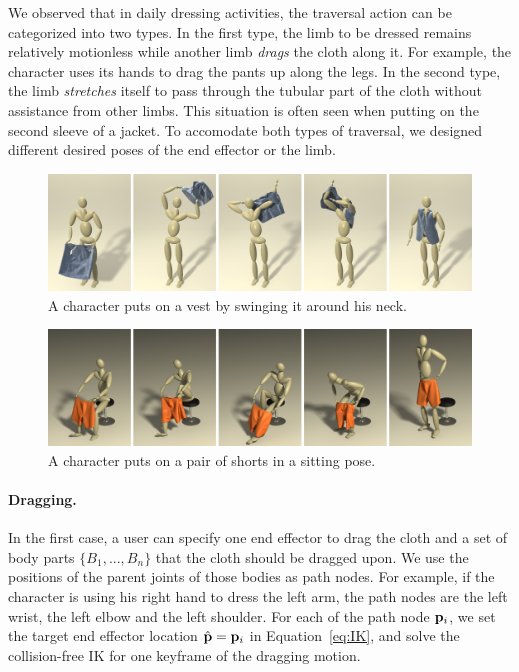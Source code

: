 We observed that in daily dressing activities, the traversal action can be categorized into two types. In the first type, the limb to be dressed remains relatively motionless while another limb \emph{drags} the cloth along it. For example, the character uses its hands to drag the pants up along the legs. In the second type, the limb \emph{stretches} itself to pass through the tubular part of the cloth without assistance from other limbs. This situation is often seen when putting on the second sleeve of a jacket. To accomodate both types of traversal, we designed different desired poses of the end effector or the limb.


\begin{figure}[!t]
  \centering
  \includegraphics[width=\textwidth]{images/vest}
  \caption{A character puts on a vest by swinging it around his neck.}
  \label{fig:vest}
\end{figure}

\begin{figure}[!t]
  \centering
  \includegraphics[width=\textwidth]{images/shortsSitting}
  \caption{A character puts on a pair of shorts in a sitting pose.}
  \label{fig:shorts1}
\end{figure}



\paragraph{Dragging.} In the first case, a user can specify one end effector to drag the cloth and a set of body parts $\{B_1 ,..., B_n\}$ that the cloth should be dragged upon. We use the positions of the parent joints of those bodies as path nodes. For example, if the character is using his  right hand to dress the left arm, the path nodes are the left wrist, the left elbow and the left shoulder. For each of the path node $\mathbf{p}_i$, we set the target end effector location $\hat{\mathbf{p}}=\mathbf{p}_i$ in Equation~\ref{eq:IK}, and solve the collision-free IK for one keyframe of the dragging motion. 

